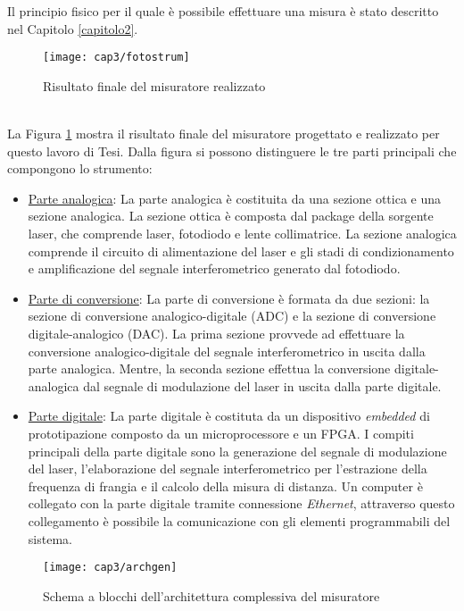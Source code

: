 Il principio fisico per il quale è possibile effettuare una misura è stato descritto nel Capitolo \ref{capitolo2}.
\begin{figure}  
  \begin{center}
    \texttt{[image: cap3/fotostrum]}
    \caption{Risultato finale del misuratore realizzato}
    \label{fotorisfin}
  \end{center}
\end{figure}\\
La Figura \ref{fotorisfin} mostra il risultato finale del misuratore progettato e realizzato per questo lavoro di Tesi. Dalla figura si possono distinguere le tre parti principali che compongono lo strumento:
\begin{itemize}
	\item \underline{Parte analogica}: La parte analogica è costituita da una sezione ottica e una sezione analogica. La sezione ottica è composta dal package della sorgente laser, che comprende laser, fotodiodo e lente collimatrice. La sezione analogica comprende il circuito di alimentazione del laser e gli stadi di condizionamento e amplificazione del segnale interferometrico generato dal fotodiodo.
	\item \underline{Parte di conversione}: La parte di conversione è formata da due sezioni: la sezione di conversione analogico-digitale (ADC) e la sezione di conversione digitale-analogico (DAC). La prima sezione provvede ad effettuare la conversione analogico-digitale del segnale interferometrico in uscita dalla parte analogica. Mentre, la seconda sezione effettua la conversione digitale-analogica dal segnale di modulazione del laser in uscita dalla parte digitale.
	\item \underline{Parte digitale}: La parte digitale è costituta da un dispositivo \textit{embedded} di prototipazione composto da un microprocessore e un FPGA. I compiti principali della parte digitale sono la generazione del segnale di modulazione del laser, l'elaborazione del segnale interferometrico per l'estrazione della frequenza di frangia e il calcolo della misura di distanza. Un computer è collegato con la parte digitale tramite connessione \textit{Ethernet}, attraverso questo collegamento è possibile la comunicazione con gli elementi programmabili del sistema.
\end{itemize}
\begin{figure}  
  \begin{center}
    \texttt{[image: cap3/archgen]}
    \caption{Schema a blocchi dell'architettura complessiva del misuratore}
    \label{archgen}
  \end{center}
\end{figure}

